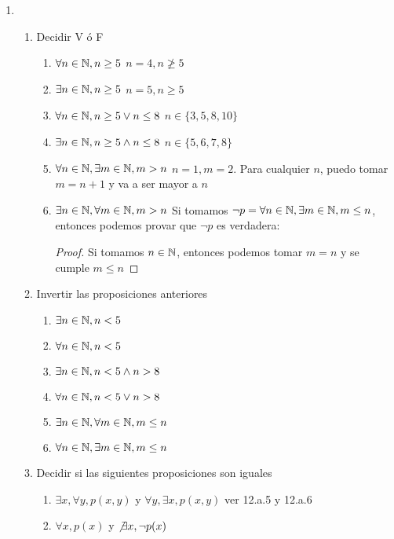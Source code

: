 \documentclass[../practica.root.tex]{subfiles}
\begin{document}
\begin{enumerate}
    \item \begin{enumerate}
              \item Decidir V ó F
                    \begin{enumerate}
                        \item $\forall n \in \mathbb{N}, n \geq 5$ \xmark $n = 4, n \not\geq 5 $
                        \item $\exists n \in \mathbb{N}, n \geq 5$ \cmark $n = 5, n \geq 5 $
                        \item $\forall n \in \mathbb{N}, n \geq 5 \lor n \leq 8$ \cmark $n \in \{3, 5, 8, 10\}$
                        \item $\exists n \in \mathbb{N}, n \geq 5 \land n \leq 8$ \cmark $n \in \{5, 6, 7, 8\}$
                        \item $\forall n \in \mathbb{N}, \exists m \in \mathbb{N}, m > n$ \cmark $n = 1, m = 2$. Para cualquier $n$, puedo tomar $m = n+1$ y va a ser mayor a $n$
                        \item $\exists n \in \mathbb{N}, \forall m \in \mathbb{N}, m > n$ \xmark Si tomamos $\neg p = \forall n \in \mathbb{N}, \exists m \in \mathbb{N}, m \leq n$, entonces podemos provar que $\neg p$ es verdadera:
                              \begin{proof}
                                  Si tomamos $n \in \mathbb{N}$, entonces podemos tomar $m = n$ y se cumple $m \leq n$
                              \end{proof}
                    \end{enumerate}
              \item Invertir las proposiciones anteriores
                    \begin{enumerate}
                        \item $\exists n \in \mathbb{N}, n < 5$
                        \item $\forall n \in \mathbb{N}, n < 5$
                        \item $\exists n \in \mathbb{N}, n < 5 \land n > 8$
                        \item $\forall n \in \mathbb{N}, n < 5 \lor n > 8$
                        \item $\exists n \in \mathbb{N}, \forall m \in \mathbb{N}, m \leq n$
                        \item $\forall n \in \mathbb{N}, \exists m \in \mathbb{N}, m \leq n$
                    \end{enumerate}
              \item Decidir si las siguientes proposiciones son iguales
                    \begin{enumerate}
                        \item $\exists x, \forall y, p(x, y)$ y $\forall y,\exists x, p(x, y)$ \xmark ver 12.a.5 y 12.a.6
                        \item $\forall x, p(x)$ y $\not\exists x, \neg p(x)$
                    \end{enumerate}


\end{enumerate}
\end{enumerate}
\end{document}
